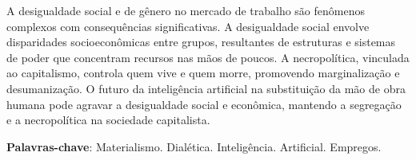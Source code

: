 A desigualdade social e de gênero no mercado de trabalho são fenômenos complexos com consequências significativas. A desigualdade social envolve disparidades socioeconômicas entre grupos, resultantes de estruturas e sistemas de poder que concentram recursos nas mãos de poucos. A necropolítica, vinculada ao capitalismo, controla quem vive e quem morre, promovendo marginalização e desumanização. O futuro da inteligência artificial na substituição da mão de obra humana pode agravar a desigualdade social e econômica, mantendo a segregação e a necropolítica na sociedade capitalista.
 \vspace{\onelineskip}
    
 \textbf{Palavras-chave}: Materialismo. Dialética. Inteligência. Artificial. Empregos.
\pagebreak
